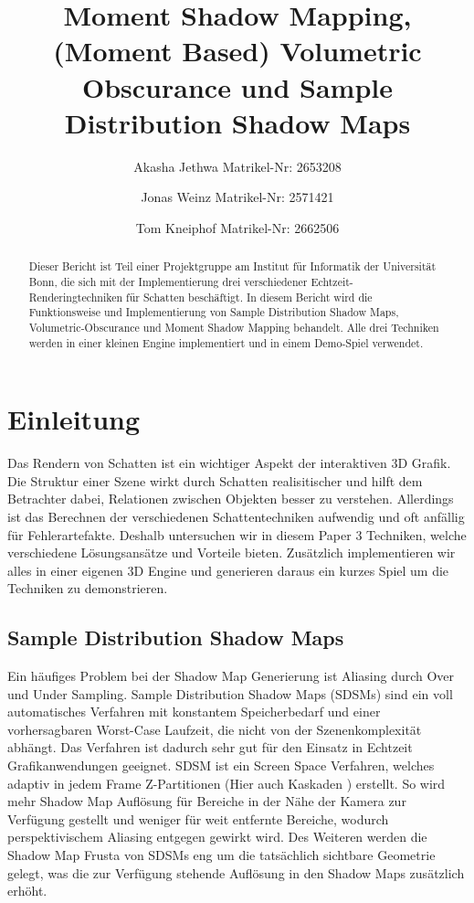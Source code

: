 \documentclass[runningheaders,a4paper]{llncs}
\title{ Moment Shadow Mapping, (Moment Based) Volumetric Obscurance und Sample Distribution Shadow Maps }
\author{
	Akasha Jethwa 
	Matrikel-Nr: 2653208
	\and
	Jonas Weinz 
	Matrikel-Nr: 2571421
	\and
	Tom Kneiphof 
	Matrikel-Nr: 2662506
}
\institute{Institut für Informatik der Universität Bonn}
\begin{document}
\maketitle

\begin{abstract}
Dieser Bericht ist Teil einer Projektgruppe am Institut für Informatik der Universität Bonn,
die sich mit der Implementierung drei verschiedener Echtzeit-Renderingtechniken für Schatten beschäftigt.
In diesem Bericht wird die Funktionsweise und Implementierung von Sample Distribution Shadow Maps, Volumetric-Obscurance und Moment Shadow Mapping behandelt.
Alle drei Techniken werden in einer kleinen Engine implementiert und in einem Demo-Spiel verwendet.
\end{abstract}


\section{Einleitung}
Das Rendern von Schatten ist ein wichtiger Aspekt der interaktiven 3D Grafik.
Die Struktur einer Szene wirkt durch Schatten realisitischer und hilft dem Betrachter dabei, Relationen zwischen Objekten besser zu verstehen.
Allerdings ist das Berechnen der verschiedenen Schattentechniken aufwendig und oft anfällig für Fehlerartefakte.
Deshalb untersuchen wir in diesem Paper 3 Techniken, welche verschiedene Lösungsansätze und Vorteile bieten.
Zusätzlich implementieren wir alles in einer eigenen 3D Engine und generieren daraus ein kurzes Spiel um die Techniken zu demonstrieren.


\subsection{Sample Distribution Shadow Maps}

Ein häufiges Problem bei der Shadow Map Generierung ist Aliasing durch Over und Under Sampling.
Sample Distribution Shadow Maps (SDSMs) \cite{sdsm} sind ein voll automatisches Verfahren mit konstantem Speicherbedarf und einer vorhersagbaren Worst-Case Laufzeit, die nicht von der Szenenkomplexität abhängt.
Das Verfahren ist dadurch sehr gut für den Einsatz in Echtzeit Grafikanwendungen geeignet.
SDSM ist ein Screen Space Verfahren, welches adaptiv in jedem Frame Z-Partitionen \cite{zpart} (Hier auch Kaskaden \cite{csm}) erstellt.
So wird mehr Shadow Map Auflösung für Bereiche in der Nähe der Kamera zur Verfügung gestellt und weniger für weit entfernte Bereiche, wodurch perspektivischem Aliasing entgegen gewirkt wird.
Des Weiteren werden die Shadow Map Frusta von SDSMs eng um die tatsächlich sichtbare Geometrie gelegt, was die zur Verfügung stehende Auflösung in den Shadow Maps zusätzlich erhöht.
\end{document}
